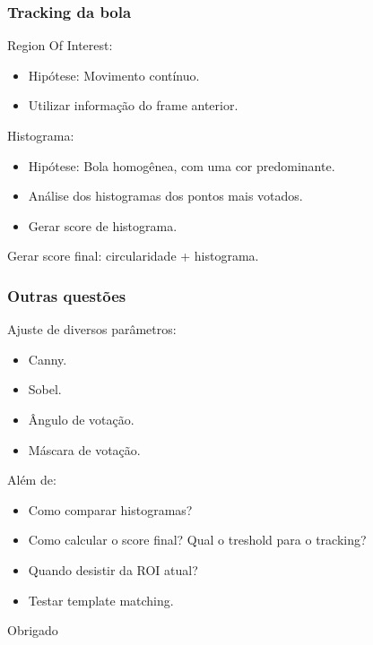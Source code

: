 \documentclass{beamer}
\begin{document}
\begin{frame}
\frametitle{Tracking da bola}

\vfill

Region Of Interest:

\begin{itemize}
 \item Hipótese: Movimento contínuo.
 \item Utilizar informação do frame anterior.
\end{itemize}

\vfill

Histograma:

\begin{itemize}
 \item Hipótese: Bola homogênea, com uma cor predominante.
 \item Análise dos histogramas dos pontos mais votados.
 \item Gerar score de histograma.
\end{itemize}

\vfill

Gerar score final: circularidade + histograma.

\vfill

\end{frame}

\begin{frame}
\frametitle{Outras questões}

\vfill

Ajuste de diversos parâmetros:

\begin{itemize}
 \item Canny.
 \item Sobel.
 \item Ângulo de votação.
 \item Máscara de votação.
\end{itemize}

\vfill

Além de:

\begin{itemize}
 \item Como comparar histogramas?
 \item Como calcular o score final? Qual o treshold para o tracking?
 \item Quando desistir da ROI atual?
 \item Testar template matching.
\end{itemize}

\vfill

\end{frame}

\begin{frame}

\vfill

\begin{center} {\Huge Obrigado}
\end{center}

\vfill

\end{frame}
\end{document}
